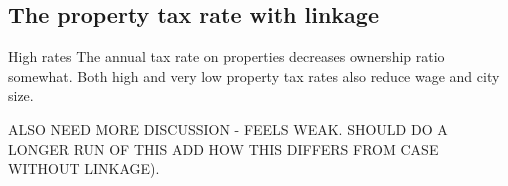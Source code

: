 \newpage
\subsection{The property tax rate  with linkage}
High rates The annual tax rate on properties decreases ownership ratio somewhat. 
Both high and very low property tax rates also reduce wage and city size. %

{\color{red}ALSO NEED MORE DISCUSSION - FEELS WEAK. SHOULD DO A LONGER RUN OF THIS}
{\color{red} ADD HOW THIS DIFFERS FROM CASE WITHOUT LINKAGE).}


